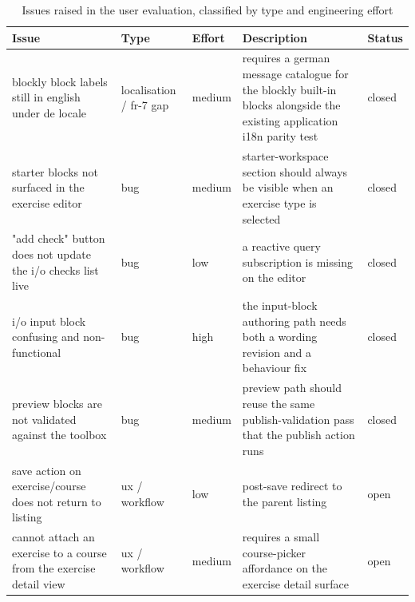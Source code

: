 \begin{table}
  \centering
  \footnotesize
  \caption{Issues raised in the user evaluation, classified by type and engineering effort}
  \label{tab:eval-issues}
  \begin{tabularx}{\textwidth}{|X|l|l|X|X|}
    \hline
    \textbf{Issue}                                                      & \textbf{Type}           & \textbf{Effort} & \textbf{Description}                                                                                                                          & \textbf{Status} \\\hline
    blockly block labels still in english under de locale               & localisation / fr-7 gap & medium          & requires a german message catalogue for the blockly built-in blocks alongside the existing application i18n parity test                       & closed          \\\hline
    starter blocks not surfaced in the exercise editor                  & bug                     & medium          & starter-workspace section should always be visible when an exercise type is selected                                                          & closed          \\\hline
    "add check" button does not update the i/o checks list live         & bug                     & low             & a reactive query subscription is missing on the editor                                                                                        & closed          \\\hline
    i/o input block confusing and non-functional                        & bug                     & high            & the input-block authoring path needs both a wording revision and a behaviour fix                                                              & closed          \\\hline
    preview blocks are not validated against the toolbox                & bug                     & medium          & preview path should reuse the same publish-validation pass that the publish action runs                                                       & closed          \\\hline
    save action on exercise/course does not return to listing           & ux / workflow           & low             & post-save redirect to the parent listing                                                                                                      & open            \\\hline
    cannot attach an exercise to a course from the exercise detail view & ux / workflow           & medium          & requires a small course-picker affordance on the exercise detail surface                                                                      & open            \\\hline

\end{tabularx}
\end{table}
